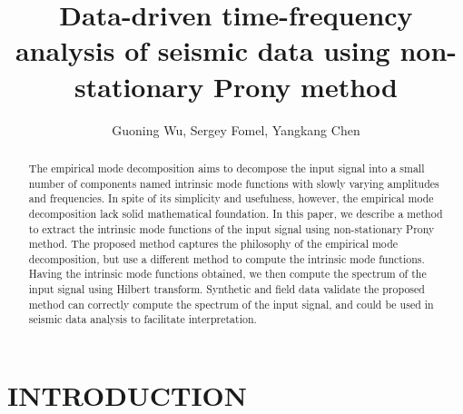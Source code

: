   
\title{Data-driven time-frequency analysis of seismic data using 
non-stationary Prony method} 
\renewcommand{\thefootnote}{\fnsymbol{footnote}}
\address{
\footnotemark[1] The College of Science\\
China University of Petroleum\\
Beijing, China
\footnotemark[2] Bureau of Economic Geology,\\
John A. and Katherine G. Jackson School of Geosciences\\
The University of Texas at Austin\\
University Station, Box X\\
Austin, TX, USA, 78731-8924\\
\footnotemark[3] Previously:  The University of Texas at Austin; Currently: Oak Ridge National Laboratory
}

\author{Guoning Wu\footnotemark[1], Sergey Fomel\footnotemark[2], Yangkang Chen\footnotemark[3]}

\maketitle

\begin{abstract}
The empirical mode decomposition aims to decompose the input signal 
into a small number of components named intrinsic mode functions 
with slowly varying amplitudes and frequencies. In spite of its simplicity
and usefulness, however, the empirical mode decomposition lack 
solid mathematical foundation. In this paper, we describe a method to 
extract the intrinsic mode functions of the input signal using 
non-stationary Prony method. The proposed method captures the 
philosophy of the empirical mode decomposition, but use a different 
method to compute the intrinsic mode functions. 
Having the intrinsic mode functions obtained, we then compute 
the spectrum of the input signal using Hilbert transform. Synthetic and field data 
validate the proposed method can correctly compute the 
spectrum of the input signal, and could be used in seismic data analysis to facilitate 
interpretation.
\end{abstract}

\section{INTRODUCTION}

